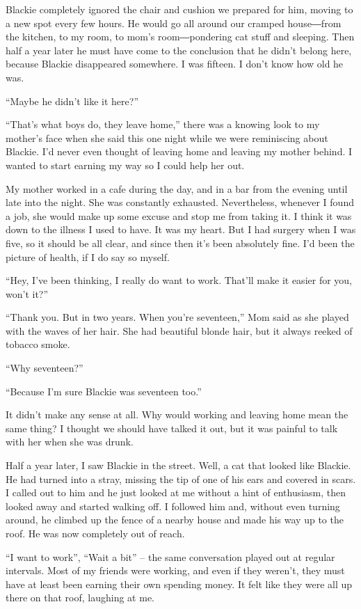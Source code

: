 \documentclass[oneside]{book}
\begin{document}
Blackie completely ignored the chair and cushion we prepared for him, moving to a new spot every few hours. He would go all around our cramped house―from the kitchen, to my room, to mom’s room―pondering cat stuff and sleeping. Then half a year later he must have come to the conclusion that he didn’t belong here, because Blackie disappeared somewhere. I was fifteen. I don’t know how old he was.

“Maybe he didn’t like it here?”

“That’s what boys do, they leave home,” there was a knowing look to my mother’s face when she said this one night while we were reminiscing about Blackie. I’d never even thought of leaving home and leaving my mother behind. I wanted to start earning my way so I could help her out.

My mother worked in a cafe during the day, and in a bar from the evening until late into the night. She was constantly exhausted. Nevertheless, whenever I found a job, she would make up some excuse and stop me from taking it. I think it was down to the illness I used to have. It was my heart. But I had surgery when I was five, so it should be all clear, and since then it’s been absolutely fine. I’d been the picture of health, if I do say so myself.

“Hey, I’ve been thinking, I really do want to work. That’ll make it easier for you, won’t it?”

“Thank you. But in two years. When you’re seventeen,” Mom said as she played with the waves of her hair. She had beautiful blonde hair, but it always reeked of tobacco smoke.

“Why seventeen?”

“Because I’m sure Blackie was seventeen too.”

It didn’t make any sense at all. Why would working and leaving home mean the same thing? I thought we should have talked it out, but it was painful to talk with her when she was drunk.

Half a year later, I saw Blackie in the street. Well, a cat that looked like Blackie. He had turned into a stray, missing the tip of one of his ears and covered in scars. I called out to him and he just looked at me without a hint of enthusiasm, then looked away and started walking off. I followed him and, without even turning around, he climbed up the fence of a nearby house and made his way up to the roof. He was now completely out of reach.

“I want to work”, “Wait a bit” – the same conversation played out at regular intervals. Most of my friends were working, and even if they weren’t, they must have at least been earning their own spending money. It felt like they were all up there on that roof, laughing at me.
\end{document}
